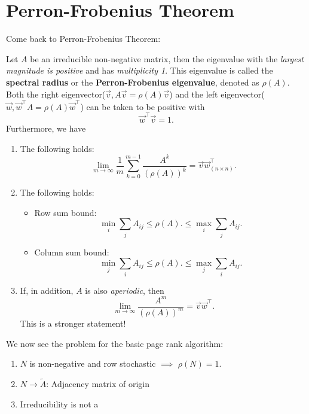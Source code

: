 \section{Perron-Frobenius Theorem}
Come back to Perron-Frobenius Theorem:
\begin{theorem}\label{Perron-Frobenius Theorem}
	Let \(A\) be an irreducible non-negative matrix, then the eigenvalue with the \emph{largest magnitude is positive}
	and has \emph{multiplicity 1}. This eigenvalue is called the \textbf{spectral radius} or the \textbf{Perron-Frobenius eigenvalue},
	denoted as \(\rho(A)\).
	Both the right eigenvector(\(\vec{v}, A \vec{v} = \rho(A) \vec{v}\)) and the left eigenvector(\(\vec{w}, \vec{w}^{\top}A = \rho(A) \vec{w}^{\top}\))
	can be taken to be positive with
	\[
		\vec{w}^{\top} \vec{v} = 1.
	\]
	Furthermore, we have
	\begin{enumerate}
		\item The following holds:
		      \[
			      \lim_{m \to \infty} \frac{1}{m} \sum\limits_{k=0}^{m-1} \frac{A^k}{(\rho(A))^k} = \vec{v} \vec{w}^{\top}_{(n\times n)}.
		      \]
		\item The following holds:
		      \begin{itemize}
			      \item Row sum bound:
			            \[
				            \min_i \sum\limits_{j} A_{ij} \leq \rho(A).\leq \max_i \sum\limits_{j} A_{ij}.
			            \]
			      \item Column sum bound:
			            \[
				            \min_j \sum\limits_{i} A_{ij} \leq \rho(A).\leq \max_j \sum\limits_{i} A_{ij}.
			            \]
		      \end{itemize}
		\item If, in addition, \(A\) is also \emph{aperiodic}, then
		      \[
			      \lim_{m \to \infty} \frac{A^m}{(\rho(A))^m} = \vec{v} \vec{w}^{\top}.
		      \]
		      This is a stronger statement!
	\end{enumerate}
\end{theorem}

\begin{problem}
We now see the problem for the basic page rank algorithm:
\begin{enumerate}
	\item \(N\) is non-negative and row stochastic \(\implies\) \(\rho(N) = 1\).
	\item \(N \to \widetilde{A}\): Adjacency matrix of origin
	\item Irreducibility is not a
\end{enumerate}
\end{problem}

